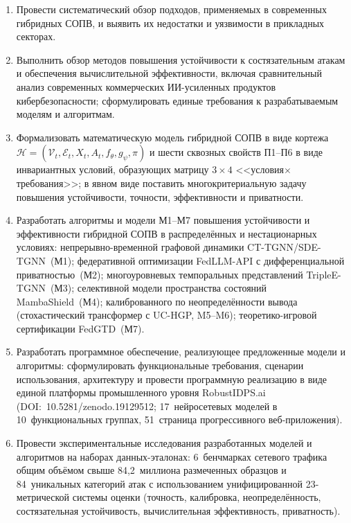 \documentclass[12pt,a5paper]{article}
\begin{document}
\begin{enumerate}
\item Провести систематический обзор подходов, применяемых
в современных гибридных СОПВ, и выявить их недостатки и
уязвимости в прикладных секторах.

\item Выполнить обзор методов повышения устойчивости к
состязательным атакам и обеспечения вычислительной
эффективности, включая сравнительный анализ современных
коммерческих ИИ-усиленных продуктов кибербезопасности;
сформулировать единые требования к разрабатываемым моделям
и алгоритмам.

\item Формализовать математическую модель гибридной СОПВ в
виде кортежа $\mathcal{H} = (\mathcal{V}_t, \mathcal{E}_t,
X_t, A_t, f_\theta, g_\psi, \pi)$ и шести сквозных свойств
П1--П6 в виде инвариантных условий, образующих матрицу
$3\times4$ <<условия$\times$требования>>; в явном виде
поставить многокритериальную задачу повышения устойчивости,
точности, эффективности и приватности.

\item Разработать алгоритмы и модели М1--М7 повышения
устойчивости и эффективности гибридной СОПВ в распределённых
и нестационарных условиях: непрерывно-временной графовой
динамики CT-TGNN/SDE-TGNN~(М1); федеративной оптимизации
FedLLM-API с дифференциальной приватностью~(М2);
многоуровневых темпоральных представлений TripleE-TGNN~(М3);
селективной модели пространства состояний MambaShield~(М4);
калиброванного по неопределённости вывода (стохастический
трансформер с UC-HGP, M5--M6); теоретико-игровой
сертификации FedGTD~(М7).

\item Разработать программное обеспечение, реализующее
предложенные модели и алгоритмы: сформулировать функциональные
требования, сценарии использования, архитектуру и провести
программную реализацию в виде единой платформы промышленного
уровня RobustIDPS.ai (DOI:~10.5281/zenodo.19129512;
17~нейросетевых моделей в 10~функциональных группах,
51~страница прогрессивного веб-приложения).

\item Провести экспериментальные исследования разработанных
моделей и алгоритмов на наборах данных-эталонах:
6~бенчмарках сетевого трафика общим объёмом свыше
84,2~миллиона размеченных образцов и 84~уникальных категорий
атак с использованием унифицированной 23-метрической системы
оценки (точность, калибровка, неопределённость, состязательная
устойчивость, вычислительная эффективность, приватность).


\end{enumerate}
\end{document}
